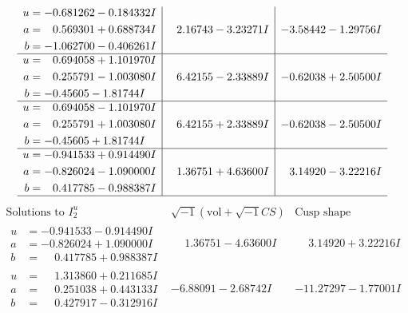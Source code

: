 \documentclass[1p]{elsarticle_modified}
\theoremstyle{definition}
\newcommand{\I}{\sqrt{-1}}
\begin{document}
$$\begin{array}{c|c|c}
\begin{aligned}
u &= -0.681262 - 0.184332 I \\
a &= \phantom{-}0.569301 + 0.688734 I \\
b &= -1.062700 - 0.406261 I\end{aligned}
 & \phantom{-}2.16743 - 3.23271 I & -3.58442 - 1.29756 I \\ \hline\begin{aligned}
u &= \phantom{-}0.694058 + 1.101970 I \\
a &= \phantom{-}0.255791 - 1.003080 I \\
b &= -0.45605 - 1.81744 I\end{aligned}
 & \phantom{-}6.42155 - 2.33889 I & -0.62038 + 2.50500 I \\ \hline\begin{aligned}
u &= \phantom{-}0.694058 - 1.101970 I \\
a &= \phantom{-}0.255791 + 1.003080 I \\
b &= -0.45605 + 1.81744 I\end{aligned}
 & \phantom{-}6.42155 + 2.33889 I & -0.62038 - 2.50500 I \\ \hline\begin{aligned}
u &= -0.941533 + 0.914490 I \\
a &= -0.826024 - 1.090000 I \\
b &= \phantom{-}0.417785 - 0.988387 I\end{aligned}
 & \phantom{-}1.36751 + 4.63600 I & \phantom{-}3.14920 - 3.22216 I\\
 \hline 
 \end{array}$$\newpage$$\begin{array}{c|c|c}  
\text{Solutions to }I^u_{2}& \I (\text{vol} + \sqrt{-1}CS) & \text{Cusp shape}\\
 \hline 
\begin{aligned}
u &= -0.941533 - 0.914490 I \\
a &= -0.826024 + 1.090000 I \\
b &= \phantom{-}0.417785 + 0.988387 I\end{aligned}
 & \phantom{-}1.36751 - 4.63600 I & \phantom{-}3.14920 + 3.22216 I \\ \hline\begin{aligned}
u &= \phantom{-}1.313860 + 0.211685 I \\
a &= \phantom{-}0.251038 + 0.443133 I \\
b &= \phantom{-}0.427917 - 0.312916 I\end{aligned}
 & -6.88091 - 2.68742 I & -11.27297 - 1.77001 I \\ \hline\begin{aligned}

\end{aligned}
\end{array}$$
\end{document}
